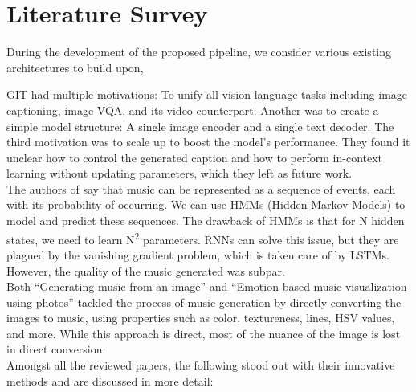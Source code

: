 \documentclass[conference]{IEEEtran}
\begin{document}
\section{Literature Survey}

{
During the development of the proposed pipeline, we consider various existing architectures to build upon,

GIT \cite{wang2022git} had multiple motivations: To unify all vision language tasks including image captioning, image VQA, and its video counterpart. Another was to create a simple model structure: A single image encoder and a single text decoder. The third motivation was to scale up to boost the model's performance. They found it unclear how to control the generated caption and how to perform in-context learning without updating parameters, which they left as future work.
\\

The authors of \cite{choi2016text} say that music can be represented as a sequence of events, each with its probability of occurring. We can use HMMs (Hidden Markov Models) to model and predict these sequences.
The drawback of HMMs is that for N hidden states, we need to learn N\textsuperscript{2} parameters. RNNs can solve this issue, but they are plagued by the vanishing gradient problem, which is taken care of by LSTMs. However, the quality of the music generated was subpar.
\\

Both ``Generating music from an image''
\cite{sergio2015generating} and ``Emotion-based music visualization using photos'' \cite{chen2008emotion} tackled the process of music generation by directly converting the images to music, using properties such as color, textureness, lines, HSV values, and more. While this approach is direct, most of the nuance of the image is lost in direct conversion.
\\

Amongst all the reviewed papers, the following stood out with their innovative methods and are discussed in more detail:
}
\end{document}
